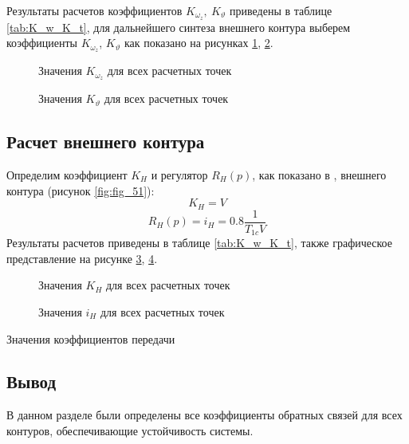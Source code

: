 Результаты расчетов коэффициентов $K_{\omega_z}, \ K_\vartheta$ приведены в таблице \ref{tab:K_w_K_t}, для дальнейшего синтеза внешнего контура выберем коэффициенты $K_{\omega_z}$, $K_\vartheta$  как показано на рисунках \ref{fig:K_omega_z}, \ref{fig:K_theta}.

\begin{minipage}[c]{\linewidth}
    \begin{figure}[H]
        \centering
        \resizebox{.79\linewidth}{!}{}
        \caption{Значения $K_{\omega_z}$ для всех расчетных точек}
        \label{fig:K_omega_z}
    \end{figure}
    \begin{figure}[H]
        \centering
        \resizebox{.79\linewidth}{!}{}
        \caption{Значения $K_{\vartheta}$ для всех расчетных точек}
        \label{fig:K_theta}
    \end{figure}
\end{minipage}

\subsection{Расчет внешнего контура}
Определим коэффициент $K_H$ и регулятор $R_H(p)$, как показано в
\cite[с.220]{control_book}, внешнего контура (рисунок \ref{fig:fig_51}):
\[
    K_H = V 
\]
\[
    R_H(p) = i_H = 0.8 \frac{1}{T_{1c}V}
\]
Результаты расчетов приведены в таблице \ref{tab:K_w_K_t}, также графическое представление на рисунке \ref{fig:K_H}, \ref{fig:i_H}. 

\begin{figure}[H]
    \centering
    \resizebox{.8\linewidth}{!}{}
    \caption{Значения $K_{H}$ для всех расчетных точек}
    \label{fig:K_H}
\end{figure}

\begin{figure}[H]
    \centering
    \resizebox{.8\linewidth}{!}{}
    \caption{Значения $i_{H}$ для всех расчетных точек}
    \label{fig:i_H}
\end{figure}

\begin{table}[H]
\centering
\caption{Значения коэффициентов передачи}
\label{tab:K_w_K_t}
\begin{adjustbox}{height=0.40\paperheight}
    
\end{adjustbox}
\end{table}

\subsection{Вывод}
В данном разделе были определены все коэффициенты обратных связей для всех
контуров, обеспечивающие устойчивость системы.

